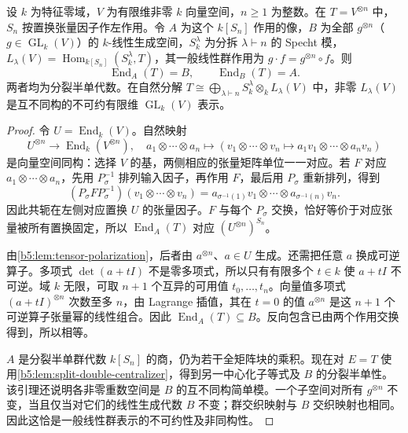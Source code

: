 \begin{theorem}\label{b5:thm:schur-weyl}
	设 \(k\) 为特征零域，\(V\) 为有限维非零 \(k\) 向量空间，\(n\ge1\) 为整数。在 \(T=V^{\otimes n}\) 中，\(S_n\) 按置换张量因子作左作用。令 \(A\) 为这个 \(k[S_n]\) 作用的像，\(B\) 为全部 \(g^{\otimes n}\)（\(g\in\operatorname{GL}_k(V)\)）的 \(k\)-线性生成空间，\(S_k^\lambda\) 为分拆 \(\lambda\vdash n\) 的 Specht 模，\(L_\lambda(V)=\operatorname{Hom}_{k[S_n]}(S_k^\lambda,T)\)，其一般线性群作用为 \(g\cdot f=g^{\otimes n}\circ f\)。则
	\[
		\operatorname{End}_A(T)=B,\qquad \operatorname{End}_B(T)=A.
	\]
	两者均为分裂半单代数。在自然分解 \(T\cong\bigoplus_{\lambda\vdash n}S_k^\lambda\otimes_k L_\lambda(V)\) 中，非零 \(L_\lambda(V)\) 是互不同构的不可约有限维 \(\operatorname{GL}_k(V)\) 表示。
\end{theorem}
\begin{proof}
	令 \(U=\operatorname{End}_k(V)\)。自然映射
	\[
		U^{\otimes n}\longrightarrow\operatorname{End}_k(V^{\otimes n}), \quad a_1\otimes\cdots\otimes a_n\longmapsto \left(v_1\otimes\cdots\otimes v_n\mapsto a_1v_1\otimes\cdots\otimes a_nv_n\right)
	\]
	是向量空间同构：选择 \(V\) 的基，两侧相应的张量矩阵单位一一对应。若 \(F\) 对应 \(a_1\otimes\cdots\otimes a_n\)，先用 \(P_\sigma^{-1}\) 排列输入因子，再作用 \(F\)，最后用 \(P_\sigma\) 重新排列，得到
	\[
		(P_\sigma F P_\sigma^{-1})(v_1\otimes\cdots\otimes v_n) =a_{\sigma^{-1}(1)}v_1\otimes\cdots\otimes a_{\sigma^{-1}(n)}v_n.
	\]
	因此共轭在左侧对应置换 \(U\) 的张量因子。\(F\) 与每个 \(P_\sigma\) 交换，恰好等价于对应张量被所有置换固定，所以 \(\operatorname{End}_A(T)\) 对应 \((U^{\otimes n})^{S_n}\)。

	由\cref{b5:lem:tensor-polarization}，后者由 \(a^{\otimes n}\)、\(a\in U\) 生成。还需把任意 \(a\) 换成可逆算子。多项式 \(\det(a+tI)\) 不是零多项式，所以只有有限多个 \(t\in k\) 使 \(a+tI\) 不可逆。域 \(k\) 无限，可取 \(n+1\) 个互异的可用值 \(t_0,\ldots,t_n\)。向量值多项式 \((a+tI)^{\otimes n}\) 次数至多 \(n\)，由 Lagrange 插值，其在 \(t=0\) 的值 \(a^{\otimes n}\) 是这 \(n+1\) 个可逆算子张量幂的线性组合。因此 \(\operatorname{End}_A(T)\subseteq B\)。反向包含已由两个作用交换得到，所以相等。

	\(A\) 是分裂半单群代数 \(k[S_n]\) 的商，仍为若干全矩阵块的乘积。现在对 \(E=T\) 使用\cref{b5:lem:split-double-centralizer}，得到另一中心化子等式及 \(B\) 的分裂半单性。该引理还说明各非零重数空间是 \(B\) 的互不同构简单模。一个子空间对所有 \(g^{\otimes n}\) 不变，当且仅当对它们的线性生成代数 \(B\) 不变；群交织映射与 \(B\) 交织映射也相同。因此这恰是一般线性群表示的不可约性及非同构性。
\end{proof}

